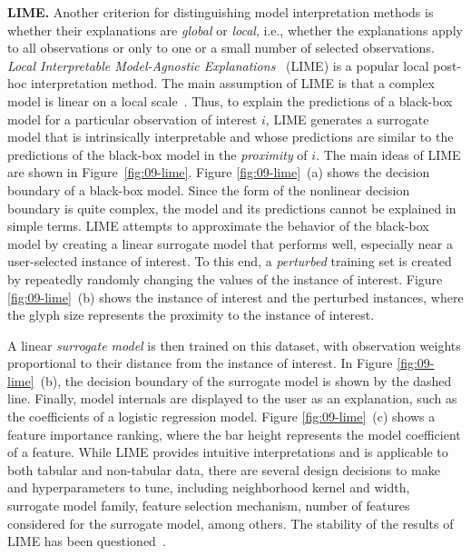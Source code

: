 \documentclass[
  oneside]{book}
\begin{document}
\textbf{LIME.} Another criterion for distinguishing model interpretation methods is whether their explanations are \emph{global} or \emph{local}, i.e., whether the explanations apply to all observations or only to one or a small number of selected observations.
\emph{Local Interpretable Model-Agnostic Explanations}~\autocite{RibeiroEtAl:KDD2016} (LIME) is a popular local post-hoc interpretation method.
The main assumption of LIME is that a complex model is linear on a local scale~\autocite{RibeiroEtAl:KDD2016}.
Thus, to explain the predictions of a black-box model for a particular observation of interest \(i\), LIME generates a surrogate model that is intrinsically interpretable and whose predictions are similar to the predictions of the black-box model in the \emph{proximity} of \(i\).
The main ideas of LIME are shown in Figure~\ref{fig:09-lime}.
Figure \ref{fig:09-lime}~(a) shows the decision boundary of a black-box model.
Since the form of the nonlinear decision boundary is quite complex, the model and its predictions cannot be explained in simple terms.
LIME attempts to approximate the behavior of the black-box model by creating a linear surrogate model that performs well, especially near a user-selected instance of interest.
To this end, a \emph{perturbed} training set is created by repeatedly randomly changing the values of the instance of interest.
Figure \ref{fig:09-lime}~(b) shows the instance of interest and the perturbed instances, where the glyph size represents the proximity to the instance of interest.

A linear \emph{surrogate model} is then trained on this dataset, with observation weights proportional to their distance from the instance of interest.
In Figure \ref{fig:09-lime}~(b), the decision boundary of the surrogate model is shown by the dashed line.
Finally, model internals are displayed to the user as an explanation, such as the coefficients of a logistic regression model.
Figure \ref{fig:09-lime}~(c) shows a feature importance ranking, where the bar height represents the model coefficient of a feature.
While LIME provides intuitive interpretations and is applicable to both tabular and non-tabular data, there are several design decisions to make and hyperparameters to tune, including neighborhood kernel and width, surrogate model family, feature selection mechanism, number of features considered for the surrogate model, among others.
The stability of the results of LIME has been questioned~\autocite{alvarez2018robustness,visani2020optilime}.
\end{document}
